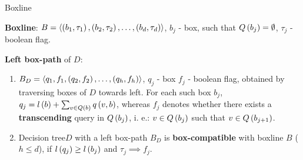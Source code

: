 \begin{frame}
    
\end{frame}
\begin{frame}{Boxline}
    \begin{definition}
        \textbf{Boxline}: $B=\langle \left( b_1, \tau_1 \right),\left( b_2, \tau_2 \right),\dots, \left( b_d, \tau_d \right) \rangle$, $b_j$ - box, such that $Q\left( b_j \right)=\emptyset$, $\tau_j$ - boolean flag. 
    \end{definition}
    \pause
    \begin{definition}
    \textbf{Left box-path} of $D$: 
    \begin{enumerate}
        \item $B_D=\langle {q_1, f_1},\left( q_2, f_2 \right),\dots, \left( q_h, f_h \right) \rangle$, $q_j$ - box $f_j$ - boolean flag, obtained by traversing boxes of $D$ towards left. For each such box $b_j$, $q_j=l\left( b \right)+\sum_{v\in Q\left( b \right)}q\left( v, b \right)$, whereas $f_j$ denotes whether there exists a \textbf{transcending} query in $Q\left( b_j \right)$, i. e.: $v\in Q\left( b_j \right)$  such that $v\in Q\left( b_{j+1} \right)$.
        \item Decision tree$D$ with a left box-path $B_D$ is \textbf{box-compatible} with boxline $B$ ($h\leq d$), if $l\left( q_j \right)\geq l\left( b_j \right)$ and $\tau_j\implies f_j$.
    \end{enumerate}  
    \end{definition}
\end{frame}
